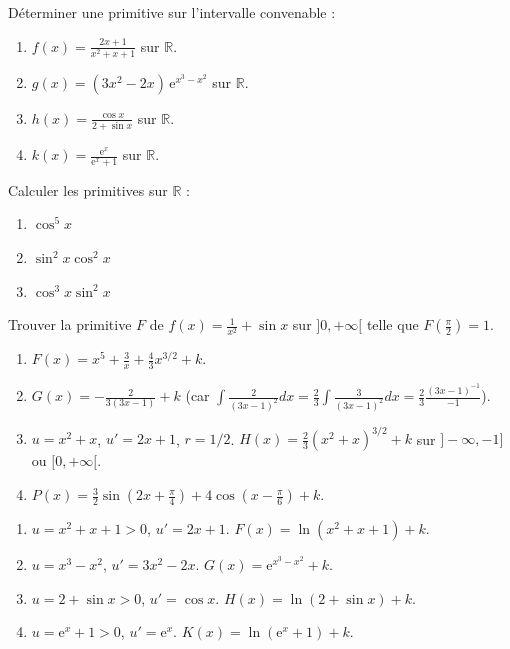 \documentclass[11pt]{article}
\begin{document}
\begin{exercice}
Déterminer une primitive sur l'intervalle convenable :
\begin{enumerate}
  \item $f(x) = \frac{2x+1}{x^2+x+1}$ sur $\mathbb{R}$.
  \item $g(x) = (3x^2-2x)\,\mathrm{e}^{x^3-x^2}$ sur $\mathbb{R}$.
  \item $h(x) = \frac{\cos x}{2+\sin x}$ sur $\mathbb{R}$.
  \item $k(x) = \frac{\mathrm{e}^x}{\mathrm{e}^x+1}$ sur $\mathbb{R}$.
\end{enumerate}
\end{exercice}

\begin{exercice}
Calculer les primitives sur $\mathbb{R}$ :
\begin{enumerate}
  \item $\cos^5 x$
  \item $\sin^2 x \cos^2 x$
  \item $\cos^3 x \sin^2 x$
\end{enumerate}
\end{exercice}

\begin{exercice}
Trouver la primitive $F$ de $f(x) = \frac{1}{x^2} + \sin x$ sur $]0,+\infty[$ telle que $F(\frac{\pi}{2}) = 1$.
\end{exercice}

\begin{corrige}[Exercice 1]
\begin{enumerate}
  \item $F(x) = x^5 + \frac{3}{x} + \frac{4}{3}x^{3/2} + k$.
  \item $G(x) = -\frac{2}{3(3x-1)} + k$ (car $\int \frac{2}{(3x-1)^2}dx = \frac{2}{3}\int \frac{3}{(3x-1)^2}dx = \frac{2}{3}\frac{(3x-1)^{-1}}{-1}$).
  \item $u=x^2+x$, $u'=2x+1$, $r=1/2$. $H(x) = \frac{2}{3}(x^2+x)^{3/2} + k$ sur $]-\infty,-1]$ ou $[0,+\infty[$.
  \item $P(x) = \frac{3}{2}\sin(2x+\frac{\pi}{4}) + 4\cos(x-\frac{\pi}{6}) + k$.
\end{enumerate}
\end{corrige}

\begin{corrige}[Exercice 2]
\begin{enumerate}
  \item $u=x^2+x+1>0$, $u'=2x+1$. $F(x) = \ln(x^2+x+1) + k$.
  \item $u=x^3-x^2$, $u'=3x^2-2x$. $G(x) = \mathrm{e}^{x^3-x^2} + k$.
  \item $u=2+\sin x > 0$, $u'=\cos x$. $H(x) = \ln(2+\sin x) + k$.
  \item $u=\mathrm{e}^x+1 > 0$, $u'=\mathrm{e}^x$. $K(x) = \ln(\mathrm{e}^x+1) + k$.
\end{enumerate}
\end{corrige}
\end{document}
